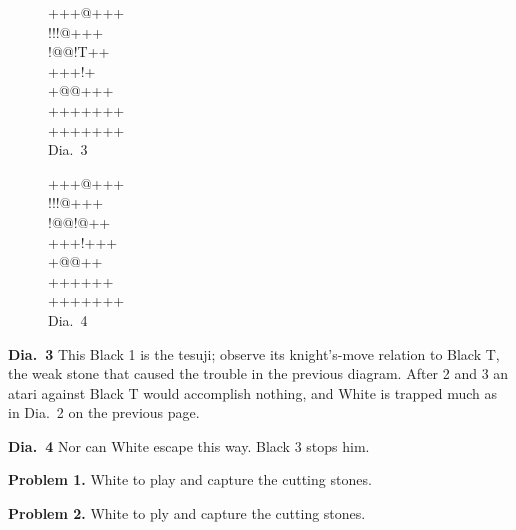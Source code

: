 \documentclass[royalvopaper,10pt,twoside,onecolumn,draft]{memoir}
\begin{document}
\begin{figure}[ht]
    \begin{minipage}[c]{0.5\linewidth}
        \centering    
        {\gnos%
        +++@+++\\
        !!!@+++\\
        !@@!T++\\
        +++!{\gnosw{}}{\gnosb{}}+\\
        +@@++{\gnosb{}}+\\
        +++++++\\
        +++++++\\
        }
        Dia.\ 3
    \end{minipage}%
    \begin{minipage}[c]{0.5\linewidth}
        \centering    
        {\gnos%
        +++@+++\\
        !!!@+++\\
        !@@!@++\\
        +++!+++\\
        +@@+{\gnosw{}}{\gnosb{}}+\\
        ++++{\gnosb{}}++\\
        +++++++\\
        }
        Dia.\ 4
    \end{minipage}
\end{figure}

\noindent
\textbf{Dia.\ 3} This Black 1 is the tesuji; observe its knight's-move relation to
Black {\gnos T}, the weak stone that caused the trouble in the previous
diagram. After 2 and 3 an atari against Black {\gnos T} would accomplish
nothing, and White is trapped much as in Dia.\ 2 on the previous page. 

\noindent
\textbf{Dia.\ 4} Nor can White escape this way. Black 3 stops him.

\noindent
\textbf{Problem 1.} White to play and capture the cutting stones.

\noindent
\textbf{Problem 2.} White to ply and capture the cutting stones.
\end{document}
